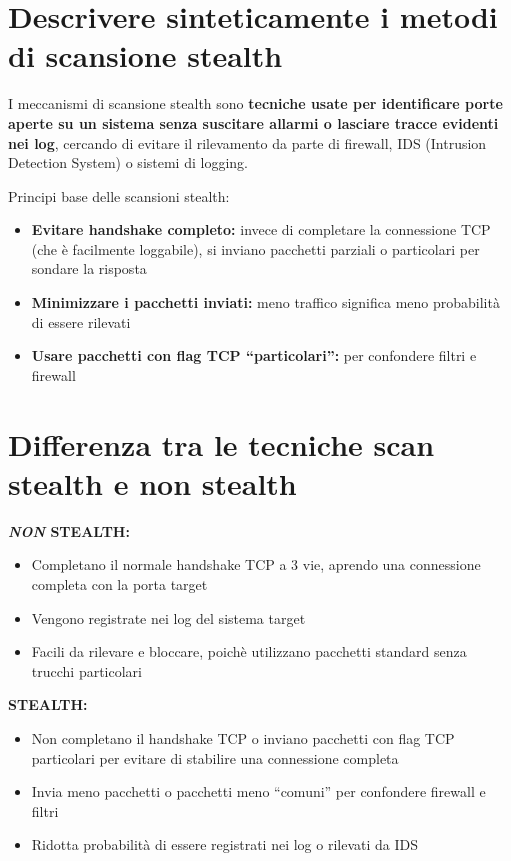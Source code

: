 \documentclass{report}
\begin{document}
\section{ Descrivere sinteticamente i metodi di scansione stealth}
\noindent I meccanismi di scansione stealth sono \textbf{tecniche usate per identificare porte aperte su un sistema senza suscitare allarmi o lasciare tracce evidenti nei log}, cercando di evitare il rilevamento da parte di firewall, IDS (Intrusion Detection System) o sistemi di logging.

\noindent Principi base delle scansioni stealth:
\begin{itemize}
    \item \textbf{Evitare handshake completo:} invece di completare la connessione TCP (che è facilmente loggabile), si inviano pacchetti parziali o particolari per sondare la risposta
    \item \textbf{Minimizzare i pacchetti inviati:} meno traffico significa meno probabilità di essere rilevati
    \item \textbf{Usare pacchetti con flag TCP “particolari”:} per confondere filtri e firewall
\end{itemize}

\section{Differenza tra le tecniche scan stealth e non stealth}
\noindent \textbf{\textit{NON} STEALTH:}
\begin{itemize}
    \item Completano il normale handshake TCP a 3 vie, aprendo una connessione completa con la porta target
    \item Vengono registrate nei log del sistema target 
    \item Facili da rilevare e bloccare, poichè utilizzano pacchetti standard senza trucchi particolari
\end{itemize}

\noindent \textbf{STEALTH:}
\begin{itemize}
    \item Non completano il handshake TCP o inviano pacchetti con flag TCP particolari per evitare di stabilire una connessione completa
    \item Invia meno pacchetti o pacchetti meno “comuni” per confondere firewall e filtri
    \item Ridotta probabilità di essere registrati nei log o rilevati da IDS
\end{itemize}
\end{document}
